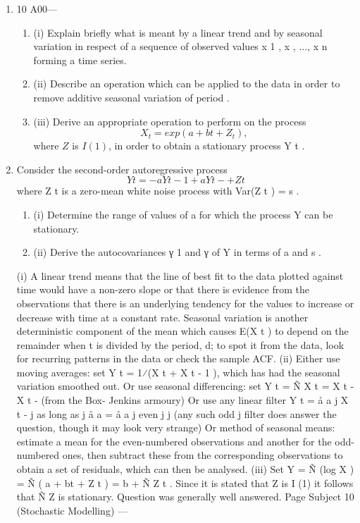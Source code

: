 \documentclass[a4paper,1pt]{article}
\begin{document}
\begin{enumerate}
\item
10 A00—
\begin{enumerate}
\item (i) Explain briefly what is meant by a linear trend and by seasonal variation in
respect of a sequence of observed values {x 1 , x  , ..., x n } forming a time series.
\item 
(ii) Describe an operation which can be applied to the data in order to remove
additive seasonal variation of period .
\item 
(iii) Derive an appropriate operation to perform on the process
\[X_t = exp(a + bt + Z_t ),\]
where $Z$ is $I(1)$, in order to obtain a stationary process Y t .
\end{enumerate}

\item 
Consider the second-order autoregressive process
\[Y t = -  a Y t - 1 + a  Y t -  + Z t\]
where {Z t } is a zero-mean white noise process with Var(Z t ) = s  .
\begin{enumerate}
\item (i) Determine the range of values of a for which the process Y can be stationary.
\item 
(ii) Derive the autocovariances γ 1 and γ  of Y in terms of a and s .
\end{enumerate}


(i)
A linear trend means that the line of best fit to the data plotted against time would have a non-zero slope or that there is evidence from the observations that there is an underlying tendency for the values to increase or decrease with
time at a constant rate.
Seasonal variation is another deterministic component of the mean which
causes E(X t ) to depend on the remainder when t is divided by the period, d; to spot it from the data, look for recurring patterns in the data or check the sample ACF.
(ii)
Either use moving averages: set Y t = 1⁄(X t + X t - 1 ), which has had the seasonal
variation smoothed out.
Or use seasonal differencing: set Y t = Ñ  X t = X t - X t -  (from the Box-
Jenkins armoury)
Or use any linear filter Y t = å a j X t - j as long as
j
å a = å a
j
even j
j
(any such
odd j
filter does answer the question, though it may look very strange)
Or method of seasonal means: estimate a mean for the even-numbered
observations and another for the odd-numbered ones, then subtract these from
the corresponding observations to obtain a set of residuals, which can then be
analysed.
(iii)
Set Y = Ñ (log X ) = Ñ ( a + bt + Z t ) = b + Ñ Z t .
Since it is stated that Z is I (1) it follows that Ñ Z is stationary.
Question  was generally well answered.
Page Subject 10 (Stochastic Modelling) — 


\end{enumerate}
\end{document}
